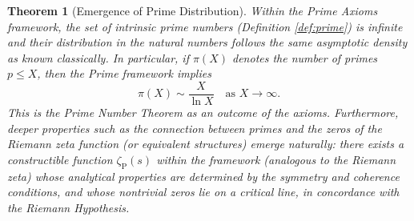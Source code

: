 \documentclass[11pt]{article}
\newtheorem{theorem}{Theorem}[section]
\begin{document}
\begin{theorem}[Emergence of Prime Distribution]\label{thm:prime-distribution}
Within the Prime Axioms framework, the set of intrinsic prime numbers (Definition \ref{def:prime}) is infinite and their distribution in the natural numbers follows the same asymptotic density as known classically. In particular, if $\pi(X)$ denotes the number of primes $p \le X$, then the Prime framework implies 
\[\pi(X) \sim \frac{X}{\ln X} \quad \text{as } X \to \infty.\] 
This is the Prime Number Theorem as an outcome of the axioms. Furthermore, deeper properties such as the connection between primes and the zeros of the Riemann zeta function (or equivalent structures) emerge naturally: there exists a constructible function $\zeta_{\mathrm{P}}(s)$ within the framework (analogous to the Riemann zeta) whose analytical properties are determined by the symmetry and coherence conditions, and whose nontrivial zeros lie on a critical line, in concordance with the Riemann Hypothesis.
\end{theorem}
\end{document}
